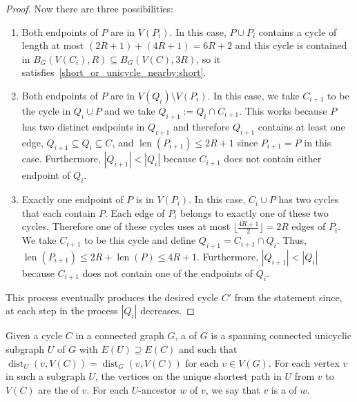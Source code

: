 \documentclass{patmorin}
\DeclareMathOperator{\len}{len}
\DeclareMathOperator{\dist}{dist}
\begin{document}
\begin{proof}
  Now there are three possibilities:
  \begin{enumerate}
    \item Both endpoints of $P$ are in $V(P_{i})$.
    In this case, $P\cup P_{i}$ contains a cycle of length at most
    $(2R+1)+(4R+1)=6R+2$ and this cycle is contained in $B_G(V(C_i),R)\subseteq B_G(V(C),3R)$, so it satisfies~\eqref{short_or_unicycle_nearby:short}.
    \item Both endpoints of $P$ are in $V(Q_{i})\setminus V(P_{i})$.
    In this case, we take $C_{i+1}$ to be the cycle     
    in $Q_{i}\cup P$ and
    we take $Q_{i+1}:= Q_i\cap C_{i+1}$. %
    This works because $P$ has two distinct endpoints in $Q_{i+1}$
    and therefore $Q_{i+1}$ contains at least one edge,
    $Q_{i+1}\subseteq Q_i\subseteq C$, and     
    $\len(P_{i+1})\leq 2R+1$ since $P_{i+1}=P$ in this case.     
    Furthermore, $|Q_{i+1}| < |Q_{i}|$ because $C_{i+1}$ does not contain either endpoint of $Q_{i}$.
    \item Exactly one endpoint of $P$ is in $V(P_{i})$.
    In this case, $C_{i}\cup P$ has two cycles that each contain $P$.
    Each edge of $P_{i}$ belongs to exactly one of these two cycles.
    Therefore one of these cycles uses at most $\lfloor\frac{4R+1}{2}\rfloor=2R$ edges of $P_{i}$.
    We take $C_{i+1}$ to be this cycle and define
    $Q_{i+1}=C_{i+1}\cap Q_i$. %
    Thus, $\len(P_{i+1}) \leq 2R+\len(P)\leq 4R+1$.
    Furthermore, $|Q_{i+1}| < |Q_{i}|$ because $C_{i+1}$ does not contain one of the endpoints of $Q_{i}$.
  \end{enumerate}
  This process eventually produces the desired cycle $C'$ from the statement since, at each step in the process $|Q_i|$ decreases.
\end{proof}

Given a cycle $C$ in a connected graph $G$, a  of $G$ is a spanning connected unicyclic subgraph $U$ of $G$ with $E(U)\supseteq E(C)$ and such that $\dist_U(v,V(C))=\dist_G(v,V(C))$ for each $v\in V(G)$.  For each vertex $v$ in such a subgraph $U$, the vertices on the unique shortest path in $U$ from $v$ to $V(C)$ are the  of $v$.  For each $U$-ancestor $w$ of $v$, we say that $v$ is a  of $w$.
\end{document}
